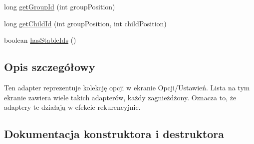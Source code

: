 \begin{DoxyCompactItemize}
\item 
long \hyperlink{classpl_1_1edu_1_1uwb_1_1mobiuwb_1_1view_1_1settings_1_1adapter_1_1_settings_adapter_a5e3647815a708b610363f8b6aeca37ae}{get\+Group\+Id} (int group\+Position)
\item 
long \hyperlink{classpl_1_1edu_1_1uwb_1_1mobiuwb_1_1view_1_1settings_1_1adapter_1_1_settings_adapter_aed21dedf263684e4f5e569344cada318}{get\+Child\+Id} (int group\+Position, int child\+Position)
\item 
boolean \hyperlink{classpl_1_1edu_1_1uwb_1_1mobiuwb_1_1view_1_1settings_1_1adapter_1_1_settings_adapter_ab6ca0a528d2fcff87100425c1c1ea8a6}{has\+Stable\+Ids} ()
\end{DoxyCompactItemize}


\subsection{Opis szczegółowy}
Ten adapter reprezentuje kolekcję opcji w ekranie Opcji/\+Ustawień. Lista na tym ekranie zawiera wiele takich adapterów, każdy zagnieżdżony. Oznacza to, że adaptery te działają w efekcie rekurencyjnie. 

\subsection{Dokumentacja konstruktora i destruktora}
\hypertarget{classpl_1_1edu_1_1uwb_1_1mobiuwb_1_1view_1_1settings_1_1adapter_1_1_settings_adapter_a1aca8d564da4844a56b14776f7a9a0fc}{}
